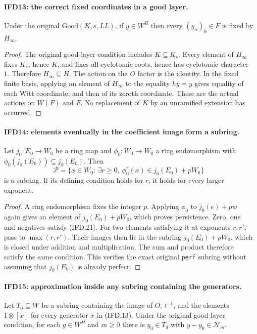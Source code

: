 \paragraph{IFD13: the correct fixed coordinates in a good layer.}
\label{claim:IFD13}
Under the original $\mathrm{Good}(K,s,LL)$, if $y\in W^H$ then
every $(y_\alpha)_0\in F$ is fixed by $H_\infty$.

\begin{proof}
The original good-layer condition includes $K\subseteq K_s$.
Every element of $H_\infty$ fixes $K_s$, hence $K$, and fixes
all cyclotomic roots, hence has cyclotomic character $1$.
Therefore $H_\infty\subseteq H$.
The action on the $O$ factor is the identity. In the fixed finite
basis, applying an element of $H_\infty$ to the equality $hy=y$
gives equality of each Witt coordinate, and then of its zeroth
coordinate. These are the actual actions on $W(F)$ and $F$.
No replacement of $K$ by an unramified extension has occurred.
\end{proof}

\paragraph{IFD14: elements eventually in the coefficient image form a subring.}
\label{claim:IFD14}
Let $j_0:E_0\to W_0$ be a ring map and $\phi_0:W_0\to W_0$
a ring endomorphism with $\phi_0(j_0(E_0))\subseteq j_0(E_0)$.
Then
\[
 \mathcal P=\{x\in W_0:\ \exists r\geq0,\
                    \phi_0^r(x)\in j_0(E_0)+pW_0\}         \tag{IFD.21}
\]
is a subring. If its defining condition holds for $r$, it holds
for every larger exponent.

\begin{proof}
A ring endomorphism fixes the integer $p$. Applying $\phi_0$
to $j_0(e)+pw$ again gives an element of $j_0(E_0)+pW_0$,
which proves persistence. Zero, one and negatives satisfy (IFD.21).
For two elements satisfying it at exponents $r,r'$, pass to
$\max(r,r')$. Their images then lie in the subring
$j_0(E_0)+pW_0$, which is closed under addition and multiplication.
The sum and product therefore satisfy the same condition.
This verifies the exact original \texttt{perf} subring without
assuming that $j_0(E_0)$ is already perfect.
\end{proof}

\paragraph{IFD15: approximation inside any subring containing the generators.}
\label{claim:IFD15}
Let $T_0\subseteq W$ be a subring containing the image of $O$,
$t^{-1}$, and the elements $1\otimes[x]$ for every generator $x$
in (IFD.13). Under the original good-layer condition, for each
$y\in W^H$ and $m\geq0$ there is $y_0\in T_0$ with
$y-y_0\in\mathcal N_m$.

